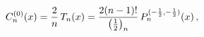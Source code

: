 \[\mathop{C^{(0)}_{n}\/}\nolimits\!\left(x\right)=\frac{2}{n}\mathop{T_{n}\/}%
\nolimits\!\left(x\right)=\frac{2(n-1)!}{\left(\tfrac{1}{2}\right)_{n}}\mathop%
{P^{(-\frac{1}{2},-\frac{1}{2})}_{n}\/}\nolimits\!\left(x\right),\]